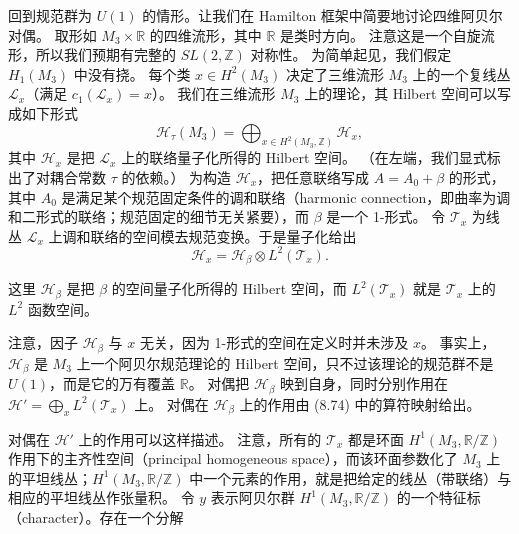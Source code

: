 回到规范群为 $U(1)$ 的情形。让我们在 Hamilton 框架中简要地讨论四维阿贝尔对偶。
取形如 $M_{3}\times\mathbb{R}$ 的四维流形，其中 $\mathbb{R}$ 是类时方向。
注意这是一个自旋流形，所以我们预期有完整的 $SL(2,\mathbb{Z})$ 对称性。
为简单起见，我们假定 $H_{1}(M_{3})$ 中没有挠。
每个类 $x\in H^{2}(M_{3})$ 决定了三维流形 $M_{3}$ 上的一个复线丛 $\mathcal{L}_{x}$（满足 $c_{1}(\mathcal{L}_{x})=x$）。
我们在三维流形 $M_{3}$ 上的理论，其 Hilbert 空间可以写成如下形式
\begin{equation}
  \tag{8.75}
  \label{eq:8-75}
  \mathcal{H}_{\tau}(M_{3})=\bigoplus_{x\in H^{2}(M_{3},\mathbb{Z})}\mathcal{H}_{x},
\end{equation}
其中 $\mathcal{H}_{x}$ 是把 $\mathcal{L}_{x}$ 上的联络量子化所得的 Hilbert 空间。
（在左端，我们显式标出了对耦合常数 $\tau$ 的依赖。）
为构造 $\mathcal{H}_{x}$，把任意联络写成 $A=A_{0}+\beta$ 的形式，其中 $A_{0}$ 是满足某个规范固定条件的调和联络（harmonic connection，即曲率为调和二形式的联络；规范固定的细节无关紧要），而 $\beta$ 是一个 1-形式。
令 $\mathcal{T}_{x}$ 为线丛 $\mathcal{L}_{x}$ 上调和联络的空间模去规范变换。于是量子化给出
\begin{equation}
  \tag{8.76}
  \label{eq:8-76}
  \mathcal{H}_{x}=\mathcal{H}_{\beta}\otimes L^{2}(\mathcal{T}_{x}).
\end{equation}

这里 $\mathcal{H}_{\beta}$ 是把 $\beta$ 的空间量子化所得的 Hilbert 空间，而 $L^{2}(\mathcal{T}_{x})$ 就是 $\mathcal{T}_{x}$ 上的 $L^{2}$ 函数空间。

注意，因子 $\mathcal{H}_{\beta}$ 与 $x$ 无关，因为 1-形式的空间在定义时并未涉及 $x$。
事实上，$\mathcal{H}_{\beta}$ 是 $M_{3}$ 上一个阿贝尔规范理论的 Hilbert 空间，只不过该理论的规范群不是 $U(1)$，而是它的万有覆盖 $\mathbb{R}$。
对偶把 $\mathcal{H}_{\beta}$ 映到自身，同时分别作用在 $\mathcal{H}'=\bigoplus_{x}L^{2}(\mathcal{T}_{x})$ 上。
对偶在 $\mathcal{H}_{\beta}$ 上的作用由 (8.74) 中的算符映射给出。

对偶在 $\mathcal{H}'$ 上的作用可以这样描述。
注意，所有的 $\mathcal{T}_{x}$ 都是环面 $H^{1}(M_{3},\mathbb{R}/\mathbb{Z})$ 作用下的主齐性空间（principal homogeneous space），而该环面参数化了 $M_{3}$ 上的平坦线丛；$H^{1}(M_{3},\mathbb{R}/\mathbb{Z})$ 中一个元素的作用，就是把给定的线丛（带联络）与相应的平坦线丛作张量积。
令 $y$ 表示阿贝尔群 $H^{1}(M_{3},\mathbb{R}/\mathbb{Z})$ 的一个特征标（character）。存在一个分解

